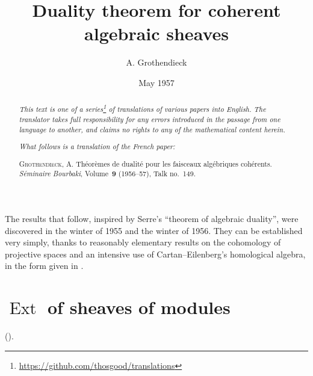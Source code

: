 \documentclass{article}
\title{Duality theorem for coherent algebraic sheaves}
\author{A. Grothendieck}
\date{May 1957}
\theoremstyle{plain}
\theoremstyle{definition}
\DeclareMathOperator{\Ext}{Ext}
\newcommand{\oldpage}[1]{\marginpar{\footnotesize$\Big\vert$ \textit{p.~#1}}}
\begin{document}
\maketitle
\thispagestyle{fancy}

\renewcommand{\abstractname}{Translator's note.}

\begin{abstract}
  \renewcommand*{\thefootnote}{\fnsymbol{footnote}}
  \emph{This text is one of a series\footnote{\url{https://github.com/thosgood/translations}} of translations of various papers into English.}
  \emph{The translator takes full responsibility for any errors introduced in the passage from one language to another, and claims no rights to any of the mathematical content herein.}
  
  \emph{What follows is a translation of the French paper:}

  \medskip\noindent
  \textsc{Grothendieck, A.}
  Th\'{e}or\`{e}mes de dualit\'{e} pour les faisceaux alg\'{e}briques coh\'{e}rents.
  \emph{S\'{e}minaire Bourbaki}, Volume~\textbf{9} (1956--57), Talk no.~149.
\end{abstract}

\setcounter{footnote}{0}

\tableofcontents
\bigskip



\oldpage{149-01}
The results that follow, inspired by Serre's ``theorem of algebraic duality'', were discovered in the winter of 1955 and the winter of 1956.
They can be established very simply, thanks to reasonably elementary results on the cohomology of projective spaces \cite{3} and an intensive use of Cartan--Eilenberg's homological algebra, in the form given in \cite{2}.


\section{\texorpdfstring{$\Ext$}{Ext} of sheaves of modules}
\label{section1}

(\cite[chap.~3 and 4]{2}).
\end{document}
